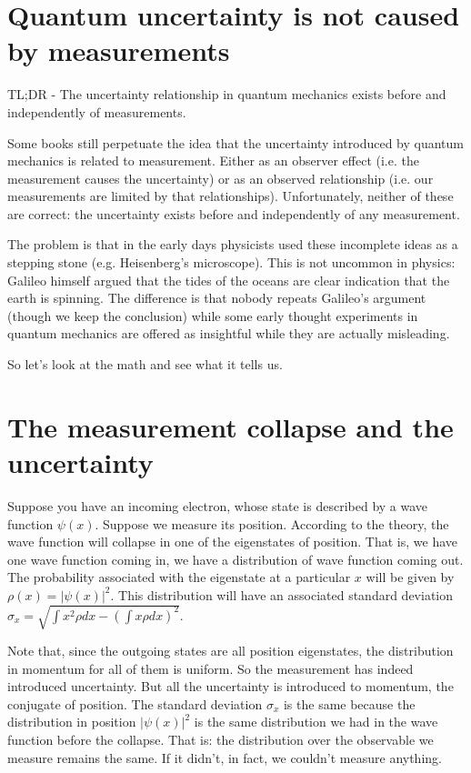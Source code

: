 \documentclass[aps,pra,10pt,floatfix,nofootinbib]{revtex4-1}
\theoremstyle{definition}
\begin{document}
\section{Quantum uncertainty is not caused by measurements}
TL;DR - The uncertainty relationship in quantum mechanics exists before and independently of measurements.

Some books still perpetuate the idea that the uncertainty introduced by quantum mechanics is related to measurement. Either as an observer effect (i.e. the measurement causes the uncertainty) or as an observed relationship (i.e. our measurements are limited by that relationships). Unfortunately, neither of these are correct: the uncertainty exists before and independently of any measurement.

The problem is that in the early days physicists used these incomplete ideas as a stepping stone (e.g. Heisenberg's microscope). This is not uncommon in physics: Galileo himself argued that the tides of the oceans are clear indication that the earth is spinning. The difference is that nobody repeats Galileo's argument (though we keep the conclusion) while some early thought experiments in quantum mechanics are offered as insightful while they are actually misleading.

So let's look at the math and see what it tells us.

\section{The measurement collapse and the uncertainty}

Suppose you have an incoming electron, whose state is described by a wave function $\psi(x)$. Suppose we measure its position. According to the theory, the wave function will collapse in one of the eigenstates of position. That is, we have one wave function coming in, we have a distribution of wave function coming out. The probability associated with the eigenstate at a particular $x$ will be given by $\rho(x) = |\psi(x)|^2$. This distribution will have an associated standard deviation $\sigma_x = \sqrt{ \int x^2 \rho dx - (\int x \rho dx)^2}$.

Note that, since the outgoing states are all position eigenstates, the distribution in momentum for all of them is uniform. So the measurement has indeed introduced uncertainty. But all the uncertainty is introduced to momentum, the conjugate of position. The standard deviation $\sigma_x$ is the same because the distribution in position $|\psi(x)|^2$ is the same distribution we had in the wave function before the collapse. That is: the distribution over the observable we measure remains the same. If it didn't, in fact, we couldn't measure anything.
\end{document}
